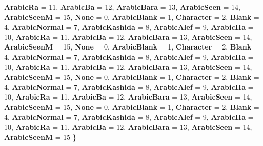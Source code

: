 \begin{DoxyCompactItemize}
\newline
{\bfseries Arabic\+Ra} = 11, 
{\bfseries Arabic\+Ba} = 12, 
{\bfseries Arabic\+Bara} = 13, 
{\bfseries Arabic\+Seen} = 14, 
\newline
{\bfseries Arabic\+SeenM} = 15, 
{\bfseries None} = 0, 
{\bfseries Arabic\+Blank} = 1, 
{\bfseries Character} = 2, 
\newline
{\bfseries Blank} = 4, 
{\bfseries Arabic\+Normal} = 7, 
{\bfseries Arabic\+Kashida} = 8, 
{\bfseries Arabic\+Alef} = 9, 
\newline
{\bfseries Arabic\+Ha} = 10, 
{\bfseries Arabic\+Ra} = 11, 
{\bfseries Arabic\+Ba} = 12, 
{\bfseries Arabic\+Bara} = 13, 
\newline
{\bfseries Arabic\+Seen} = 14, 
{\bfseries Arabic\+SeenM} = 15, 
{\bfseries None} = 0, 
{\bfseries Arabic\+Blank} = 1, 
\newline
{\bfseries Character} = 2, 
{\bfseries Blank} = 4, 
{\bfseries Arabic\+Normal} = 7, 
{\bfseries Arabic\+Kashida} = 8, 
\newline
{\bfseries Arabic\+Alef} = 9, 
{\bfseries Arabic\+Ha} = 10, 
{\bfseries Arabic\+Ra} = 11, 
{\bfseries Arabic\+Ba} = 12, 
\newline
{\bfseries Arabic\+Bara} = 13, 
{\bfseries Arabic\+Seen} = 14, 
{\bfseries Arabic\+SeenM} = 15, 
{\bfseries None} = 0, 
\newline
{\bfseries Arabic\+Blank} = 1, 
{\bfseries Character} = 2, 
{\bfseries Blank} = 4, 
{\bfseries Arabic\+Normal} = 7, 
\newline
{\bfseries Arabic\+Kashida} = 8, 
{\bfseries Arabic\+Alef} = 9, 
{\bfseries Arabic\+Ha} = 10, 
{\bfseries Arabic\+Ra} = 11, 
\newline
{\bfseries Arabic\+Ba} = 12, 
{\bfseries Arabic\+Bara} = 13, 
{\bfseries Arabic\+Seen} = 14, 
{\bfseries Arabic\+SeenM} = 15, 
\newline
{\bfseries None} = 0, 
{\bfseries Arabic\+Blank} = 1, 
{\bfseries Character} = 2, 
{\bfseries Blank} = 4, 
\newline
{\bfseries Arabic\+Normal} = 7, 
{\bfseries Arabic\+Kashida} = 8, 
{\bfseries Arabic\+Alef} = 9, 
{\bfseries Arabic\+Ha} = 10, 
\newline
{\bfseries Arabic\+Ra} = 11, 
{\bfseries Arabic\+Ba} = 12, 
{\bfseries Arabic\+Bara} = 13, 
{\bfseries Arabic\+Seen} = 14, 
\newline
{\bfseries Arabic\+SeenM} = 15
 \}
\item 
\mbox{\label{namespace_microsoft_1_1_graphics_1_1_canvas_1_1_text_a1e2efbc072261f0f4a89ae31e85b3d2a}} 

\end{DoxyCompactItemize}
